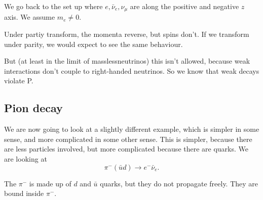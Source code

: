 \documentclass[a4paper]{article}
\begin{document}
We go back to the set up where $e, \bar{\nu}_e, \nu_\mu$ are along the positive and negative $z$ axis. We assume $m_e \not= 0$.
\begin{center}
\end{center}
Under partiy transform, the momenta reverse, but spins don't. If we transform under parity, we would expect to see the same behaviour.
\begin{center}
\end{center}
But (at least in the limit of masslessneutrinos) this isn't allowed, because weak interactions don't couple to right-handed neutrinos. So we know that weak decays violate P.

\subsection{Pion decay}
We are now going to look at a slightly different example, which is simpler in some sense, and more complicated in some other sense. This is simpler, because there are less particles involved, but more complicated because there are quarks. We are looking at
\[
  \pi^- (\bar u d) \to e^- \bar{\nu}_e.
\]
\begin{center}
\end{center}
The $\pi^-$ is made up of $d$ and $\bar{u}$ quarks, but they do not propagate freely. They are bound inside $\pi^-$.
\end{document}
